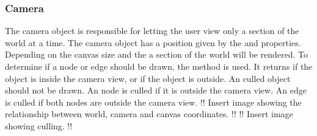 \subsubsection{Camera}
The camera object is responsible for letting the user view only a section of the world at a time. The camera object has a position given by the  and  properties. Depending on the canvas size and the  a section of the world will be rendered. To determine if a node or edge should be drawn, the  method is used. It returns  if the object is inside the camera view, or  if the object is outside. An culled object should not be drawn. An node is culled if it is outside the camera view. An edge is culled if both nodes are outside the camera view.
!! Insert image showing the relationship between world, camera and canvas coordinates. !!
!! Insert image showing culling. !!